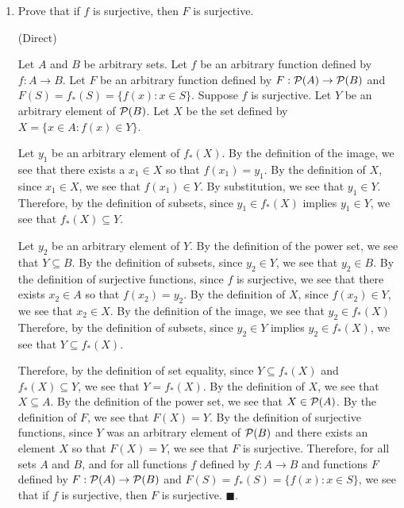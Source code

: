 \documentclass{article}
\theoremstyle{definition}
\renewcommand{\qed}{\blacksquare}
\newcommand{\powset}{{\cal P}}
\newcommand{\img}{_{*}}
\begin{document}
	\begin{enumerate}
		\item
		Prove that if $f$ is surjective, then $F$ is surjective.

		\vspace{0.2cm}
		 (Direct)
		\vspace{0.2cm}

		Let $A$ and $B$ be arbitrary sets.
		Let $f$ be an arbitrary function defined by $f : A \rightarrow B$.
		Let $F$ be an arbitrary function defined by $F : \powset (A) \rightarrow \powset (B)$ and $F(S) = f \img (S) = \{ f(x) : x \in S \}$.
		Suppose $f$ is surjective.
		Let $Y$ be an arbitrary element of $\powset(B)$.
		Let $X$ be the set defined by $X = \{x \in A : f(x) \in Y\}$.

		Let $y_1$ be an arbitrary element of $f \img (X)$.
		By the definition of the image, we see that there exists a $x_1 \in X$ so that $f(x_1) = y_1$.
		By the definition of $X$, since $x_1 \in X$, we see that $f(x_1) \in Y$.
		By substitution, we see that $y_1 \in Y$.
		Therefore, by the definition of subsets, since $y_1 \in f \img (X)$ implies $y_1 \in Y$, we see that $f \img (X) \subseteq Y$.

		Let $y_2$ be an arbitrary element of $Y$.
		By the definition of the power set, we see that $Y \subseteq B$.
		By the definition of subsets, since $y_2 \in Y$, we see that $y_2 \in B$.
		By the definition of surjective functions, since $f$ is surjective, we see that there exists $x_2 \in A$ so that $f(x_2) = y_2$.
		By the definition of $X$, since $f(x_2) \in Y$, we see that $x_2 \in X$.
		By the definition of the image, we see that $y_2 \in f \img (X)$
		Therefore, by the definition of subsets, since $y_2 \in Y$ implies $y_2 \in f \img (X)$, we see that $Y \subseteq f \img (X)$.

		Therefore, by the definition of set equality, since $Y \subseteq f \img (X)$ and $f \img (X) \subseteq Y$, we see that $Y = f \img (X)$.
		By the definition of $X$, we see that $X \subseteq A$.
		By the definition of the power set, we see that $X \in \powset (A)$.
		By the definition of $F$, we see that $F(X) = Y$.
		By the definition of surjective functions, since $Y$ was an arbitrary element of $\powset (B)$ and there exists an element $X$ so that $F(X) = Y$, we see that $F$ is surjective.
		Therefore, for all sets $A$ and $B$, and for all functions $f$ defined by $f : A \rightarrow B$ and functions $F$ defined by $F : \powset (A) \rightarrow \powset (B)$ and $F(S) = f \img (S) = \{ f(x) : x \in S \}$, we see that if $f$ is surjective, then $F$ is surjective.
		$\qed$.


\end{enumerate}
\end{document}
